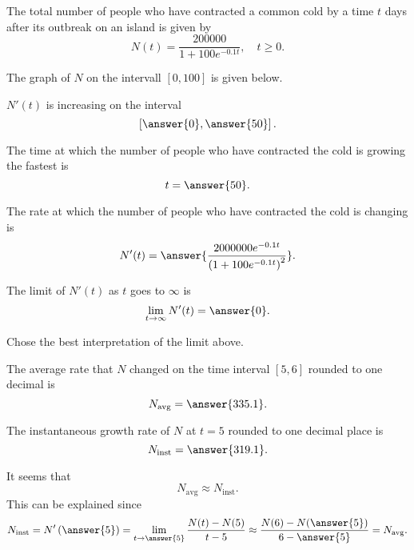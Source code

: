 \documentclass{ximera}
\author{Nela Lakos \and Kyle Parsons}
\begin{document}
\begin{exercise}

The total number of people who have contracted a common cold by a time $t$ days after its outbreak on an island is given by
\[
N(t) = \frac{200000}{1+100e^{-0.1t}},\quad t\geq0.
\]

The graph of $N$ on the intervall $[0,100]$ is given below.

\begin{image}
\end{image}

$N'(t)$ is increasing on the interval
\[
\left[\answer{0},\answer{50}\right].
\]

The time at which the number of people who have contracted the cold is growing the fastest is
\[
t = \answer{50}.
\]

The rate at which the number of people who have contracted the cold is changing is
\[
N'(t) = \answer{\frac{2000000e^{-0.1t}}{\left(1+100e^{-0.1t}\right)^2}}.
\]

The limit of $N'(t)$ as $t$ goes to $\infty$ is
\[
\lim_{t\to\infty}N'(t) = \answer{0}.
\]

Chose the best interpretation of the limit above.
\begin{multipleChoice}
\end{multipleChoice}

The average rate that $N$ changed on the time interval $[5,6]$ rounded to one decimal is
\[
N_{\text{avg}} = \answer{335.1}.
\]

The instantaneous growth rate of $N$ at $t=5$ rounded to one decimal place is
\[
N_{\text{inst}} = \answer{319.1}.
\]

It seems that 
\[
N_{\text{avg}}\approx N_{\text{inst}}.
\]
This can be explained since
\[
N_{\text{inst}} = N'\left(\answer{5}\right) = \lim_{t\to\answer{5}}\frac{N(t)-N(5)}{t-5} \approx \frac{N(6) - N(\answer{5})}{6-\answer{5}} = N_{\text{avg}}.
\]

\end{exercise}
\end{document}
